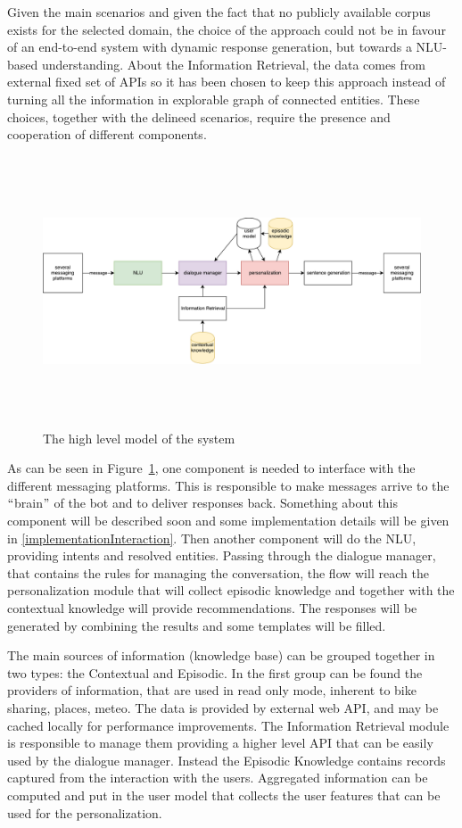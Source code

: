 Given the main scenarios and given the fact that no publicly available corpus exists for the selected domain, the choice of the approach could not be in favour of an end-to-end system with dynamic response generation, but towards a NLU-based understanding. About the Information Retrieval, the data comes from external fixed set of APIs so it has been chosen to keep this approach instead of turning all the information in explorable graph of connected entities. These choices, together with the delineed scenarios, require the presence and cooperation of different components.

\begin{figure}[!htb]
    \centering
    \includegraphics[max width=0.9\linewidth,max height=8cm,keepaspectratio]{figures/systemHighLevel}
    \caption{The high level model of the system}\label{fig:systemHighLevel}
\end{figure}

As can be seen in Figure~\ref{fig:systemHighLevel}, one component is needed to interface with the different messaging platforms. This is responsible to make messages arrive to the $``$brain$"$  of the bot and to deliver responses back. Something about this component will be described soon and some implementation details will be given in \ref{implementationInteraction}. Then another component will do the NLU, providing intents and resolved entities. Passing through the dialogue manager, that contains the rules for managing the conversation, the flow will reach the personalization module that will collect episodic knowledge and together with the contextual knowledge will provide recommendations. The responses will be generated by combining the results and some templates will be filled.

The main sources of information (knowledge base) can be grouped together in two types: the Contextual and Episodic. In the first group can be found the providers of information, that are used in read only mode, inherent to bike sharing, places, meteo. The data is provided by external web API, and may be cached locally for performance improvements. The Information Retrieval module is responsible to manage them providing a higher level API that can be easily used by the dialogue manager. Instead the Episodic Knowledge contains records captured from the interaction with the users. Aggregated information can be computed and put in the user model that collects the user features that can be used for the personalization.

